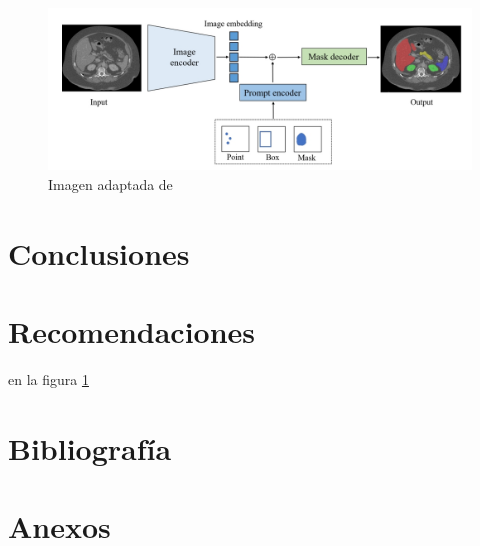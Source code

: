 \documentclass[12pt]{article}
\begin{document}
		\begin{figure}[h] 
			\centering
			\caption{ Imagen adaptada de}
			\includegraphics[width=1\textwidth]{1.jpeg}
			
			\label{fig:fig1}
			
			
		\end{figure}
	
	\newpage
	
	\section{Conclusiones}
	\newpage
	
	\section{Recomendaciones}
	en la figura \ref{fig:fig1}
	\newpage
	
	\section{Bibliograf\'ia}
	\printbibliography[title={" "}]
	\newpage
	
	\section{Anexos}
	
	
\end{document}
